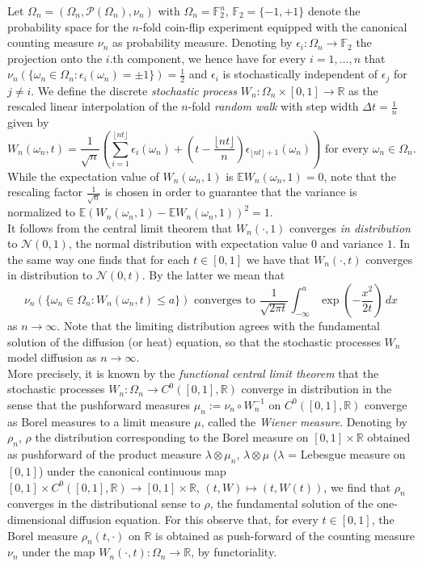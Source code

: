 \documentclass[a4paper,11pt]{amsart}
\newcommand{\RR}{\mathbb{R}}
\newcommand{\FF}{\mathbb{F}}
\newcommand{\EE}{\mathbb{E}}
\begin{document}
Let $\Omega_n=(\Omega_n,\mathcal{P}(\Omega_n),\nu_n)$ with $\Omega_n=\FF_2^n$, $\FF_2=\{-1,+1\}$ denote the probability space for the $n$-fold coin-flip experiment equipped with the canonical counting measure $\nu_n$ as probability measure. Denoting by $\epsilon_i:\Omega_n\to\FF_2$ the projection onto the $i$.th component, we hence have for every $i=1,\ldots,n$ that $\nu_n(\{\omega_n\in\Omega_n:\epsilon_i(\omega_n)=\pm 1\})=\frac{1}{2}$ and $\epsilon_i$ is stochastically independent of $\epsilon_j$ for $j\neq i$. We define the discrete \emph{stochastic process} $W_n:\Omega_n\times [0,1]\to\RR$ as the rescaled linear interpolation of the $n$-fold \emph{random walk} with step width $\Delta t=\frac{1}{n}$ given by \[W_n(\omega_n,t)=\frac{1}{\sqrt{n}}\left(\sum_{i=1}^{\lfloor nt\rfloor} \epsilon_i(\omega_n)+\left(t-\frac{\lfloor nt\rfloor}{n}\right) \epsilon_{\lfloor nt\rfloor+1}(\omega_n)\right)\,\,\textrm{for every}\,\,\omega_n\in\Omega_n.\] While the expectation value of $W_n(\omega_n,1)$ is $\EE W_n(\omega_n,1)=0$, note that the rescaling factor $\frac{1}{\sqrt{n}}$ is chosen in order to guarantee that the variance is normalized to $\EE\left(W_n(\omega_n,1)-\EE W_n(\omega_n,1)\right)^2=1$.\\\indent 
It follows from the central limit theorem that $W_n(\cdot,1)$ converges \emph{in distribution} to $\mathcal{N}(0,1)$, the normal distribution with expectation value $0$ and variance $1$. In the same way one finds that for each $t\in [0,1]$ we have that $W_n(\cdot,t)$ converges in distribution to $\mathcal{N}(0,t)$. By the latter we mean that \[\nu_n(\{\omega_n\in\Omega_n:W_n(\omega_n,t)\leq a\})\,\,\textrm{converges to}\,\, \frac{1}{\sqrt{2\pi t}}\int_{-\infty}^a \exp\left(-\frac{x^2}{2t}\right)\,dx\] as $n\to\infty$. Note that the limiting distribution agrees with the fundamental solution of the diffusion (or heat) equation, so that the stochastic processes $W_n$ model diffusion as $n\to\infty$.\\\indent 
More precisely, it is known by the \emph{functional central limit theorem} that the stochastic processes $W_n:\Omega_n\to C^0([0,1],\RR)$ converge in distribution in the sense that the pushforward measures $\mu_n:=\nu_n\circ W_n^{-1}$ on $C^0([0,1],\RR)$ converge as Borel measures to a limit measure $\mu$, called the \emph{Wiener measure}. Denoting by $\rho_n$, $\rho$ the distribution corresponding to the Borel measure on $[0,1]\times\RR$ obtained as pushforward of the product measure $\lambda\otimes\mu_n$, $\lambda\otimes\mu$ ($\lambda$ = Lebesgue measure on $[0,1]$) under the canonical continuous map $[0,1]\times C^0([0,1],\RR)\to [0,1]\times\RR$, $(t,W)\mapsto (t,W(t))$, we find that $\rho_n$ converges in the distributional sense to $\rho$, the fundamental solution of the one-dimensional diffusion equation. For this observe that, for every $t\in [0,1]$, the Borel measure $\rho_n(t,\cdot)$ on $\RR$ is obtained as push-forward of the counting measure $\nu_n$ under the map $W_n(\cdot,t):\Omega_n\to\RR$,  by functoriality.\\\indent 
\end{document}
